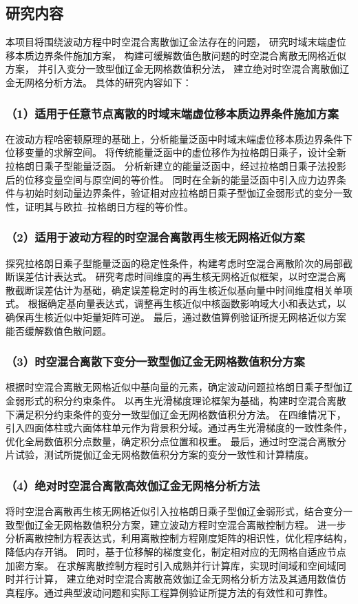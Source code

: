 \subsection{研究内容}
本项目将围绕波动方程中时空混合离散伽辽金法存在的问题，
研究时域末端虚位移本质边界条件施加方案，
构建可缓解数值色散问题的时空混合离散无网格近似方案，
并引入变分一致型伽辽金无网格数值积分法，
建立绝对时空混合离散伽辽金无网格分析方法。
具体的研究内容如下：

\subsubsection*{\bfseries （1）适用于任意节点离散的时域末端虚位移本质边界条件施加方案}
在波动方程哈密顿原理的基础上，分析能量泛函中时域末端虚位移本质边界条件下位移变量的求解空间。
将传统能量泛函中的虚位移作为拉格朗日乘子，设计全新拉格朗日乘子型能量泛函。
分析新建立的能量泛函中，经过拉格朗日乘子法投影后的位移变量空间与原空间的等价性。
同时在全新的能量泛函中引入应力边界条件与初始时刻动量边界条件，验证相对应拉格朗日乘子型伽辽金弱形式的变分一致性，证明其与欧拉--拉格朗日方程的等价性。


\subsubsection*{\bfseries （2）适用于波动方程的时空混合离散再生核无网格近似方案}
探究拉格朗日乘子型能量泛函的稳定性条件，构建考虑时空混合离散阶次的局部截断误差估计表达式。
研究考虑时间维度的再生核无网格近似框架，以时空混合离散截断误差估计为基础，确定误差稳定时的再生核近似基向量中时间维度相关单项式。
根据确定基向量表达式，调整再生核近似中核函数影响域大小和表达式，以确保再生核近似中矩量矩阵可逆。
最后，通过数值算例验证所提无网格近似方案能否缓解数值色散问题。

\subsubsection*{\bfseries （3）时空混合离散下变分一致型伽辽金无网格数值积分方案}
根据时空混合离散无网格近似中基向量的元素，确定波动问题拉格朗日乘子型伽辽金弱形式的积分约束条件。
以再生光滑梯度理论框架为基础，构建时空混合离散下满足积分约束条件的变分一致型伽辽金无网格数值积分方法。
在四维情况下，引入四面体柱或六面体柱单元作为背景积分域。通过再生光滑梯度的一致性条件，优化全局数值积分点数量，确定积分点位置和权重。
最后，通过时空混合离散分片试验，测试所提伽辽金无网格数值积分方案的变分一致性和计算精度。

\subsubsection*{\bfseries （4）绝对时空混合离散高效伽辽金无网格分析方法}
将时空混合离散再生核无网格近似引入拉格朗日乘子型伽辽金弱形式，结合变分一致型伽辽金无网格数值积分方案，建立波动方程时空混合离散控制方程。
进一步分析离散控制方程表达式，利用离散控制方程刚度矩阵的相识性，优化程序结构，降低内存开销。
同时，基于位移解的梯度变化，制定相对应的无网格自适应节点加密方案。
在求解离散控制方程时引入成熟并行计算库，实现时间域和空间域同时并行计算，
建立绝对时空混合离散高效伽辽金无网格分析方法及其通用数值仿真程序。通过典型波动问题和实际工程算例验证所提方法的有效性和可靠性。


